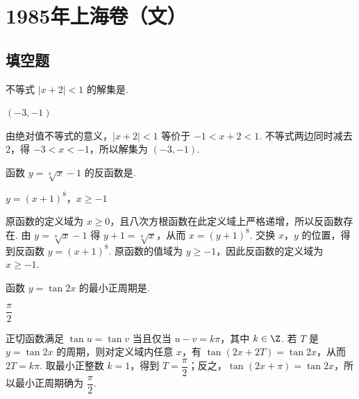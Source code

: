 \documentclass[UTF8,a4paper,oneside,11pt]{ctexbook}
\begin{document}
\mainmatter

\chapter{1985年上海卷（文）}

\section{填空题}

\begin{problem}

不等式 \(\left|x+2\right|<1\) 的解集是\fillinblank{}.

\begin{answer}
\(\left(-3,-1\right)\)
\end{answer}

\begin{solution}
由绝对值不等式的意义，\(\left|x+2\right|<1\) 等价于 \(-1<x+2<1\). 不等式两边同时减去 \(2\)，得 \(-3<x<-1\)，所以解集为 \(\left(-3,-1\right)\).
\end{solution}
\end{problem}

\begin{problem}

函数 \(y=\sqrt[8]{x}-1\) 的反函数是\fillinblank{}.

\begin{answer}
\(y=(x+1)^8\)，\(x\geqslant-1\)
\end{answer}

\begin{solution}
原函数的定义域为 \(x\geqslant0\)，且八次方根函数在此定义域上严格递增，所以反函数存在. 由 \(y=\sqrt[8]{x}-1\) 得 \(y+1=\sqrt[8]{x}\)，从而 \(x=(y+1)^8\). 交换 \(x\)，\(y\) 的位置，得到反函数 \(y=(x+1)^8\). 原函数的值域为 \(y\geqslant-1\)，因此反函数的定义域为 \(x\geqslant-1\).
\end{solution}
\end{problem}

\begin{problem}

函数 \(y=\tan 2x\) 的最小正周期是\fillinblank{}.

\begin{answer}
\(\dfrac{\pi}{2}\)
\end{answer}

\begin{solution}
正切函数满足 \(\tan u=\tan v\) 当且仅当 \(u-v=k\pi\)，其中 \(k\in\Z\). 若 \(T\) 是 \(y=\tan 2x\) 的周期，则对定义域内任意 \(x\)，有 \(\tan(2x+2T)=\tan 2x\)，从而 \(2T=k\pi\). 取最小正整数 \(k=1\)，得到 \(T=\dfrac{\pi}{2}\)；反之，\(\tan\left(2x+\pi\right)=\tan 2x\)，所以最小正周期确为 \(\dfrac{\pi}{2}\).
\end{solution}
\end{problem}
\end{document}
